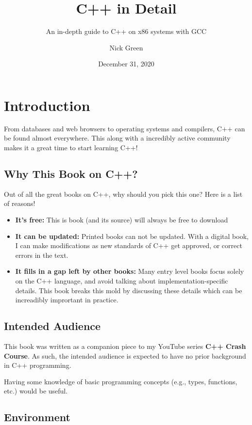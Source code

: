 \documentclass[11pt,fancy,authoryear]{elegantbook}
\title{C++ in Detail}
\subtitle{An in-depth guide to C++ on x86 systems with GCC}
\author{Nick Green}
\institute{CoffeeBeforeArch}
\date{December 31, 2020}
\begin{document}
\maketitle

\frontmatter
\tableofcontents

\mainmatter

\chapter{Introduction}

From databases and web browsers to operating systems and compilers, C++ can be found almost everywhere. This along with a incredibly active community makes it a great time to start learning C++!

\section{Why This Book on C++?}

Out of all the great books on C++, why should you pick this one? Here is a list of reasons!

\begin{itemize}
  \item \textbf{It's free:} This is book (and its source) will always be free to download
  \item \textbf{It can be updated:} Printed books can not be updated. With a digital book, I can make modifications as new standards of C++ get approved, or correct errors in the text.
  \item \textbf{It fills in a gap left by other books:} Many entry level books focus solely on the C++ language, and avoid talking about implementation-specific details. This book breaks this mold by discussing these details which can be increadibly imprortant in practice.
\end{itemize}

\section{Intended Audience}

This book was written as a companion piece to my YouTube series \textbf{C++ Crash Course}. As such, the intended audience is expected to have no prior background in C++ programming.

Having some knowledge of basic programming concepts (e.g., types, functions, etc.) would be useful.

\section{Environment}
\end{document}
